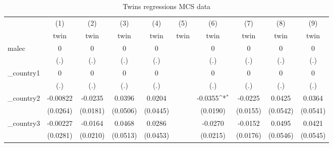 \begin{table}[htbp]\centering
\def\sym#1{\ifmmode^{#1}\else\(^{#1}\)\fi}
\caption{Twins regressions MCS data}
\begin{tabular}{l*{9}{c}}
\hline\hline
            &\multicolumn{1}{c}{(1)}&\multicolumn{1}{c}{(2)}&\multicolumn{1}{c}{(3)}&\multicolumn{1}{c}{(4)}&\multicolumn{1}{c}{(5)}&\multicolumn{1}{c}{(6)}&\multicolumn{1}{c}{(7)}&\multicolumn{1}{c}{(8)}&\multicolumn{1}{c}{(9)}\\
            &\multicolumn{1}{c}{twin}&\multicolumn{1}{c}{twin}&\multicolumn{1}{c}{twin}&\multicolumn{1}{c}{twin}&\multicolumn{1}{c}{twin}&\multicolumn{1}{c}{twin}&\multicolumn{1}{c}{twin}&\multicolumn{1}{c}{twin}&\multicolumn{1}{c}{twin}\\
\hline
malec       &           0         &           0         &           0         &           0         &                     &           0         &           0         &           0         &           0         \\
            &         (.)         &         (.)         &         (.)         &         (.)         &                     &         (.)         &         (.)         &         (.)         &         (.)         \\
[1em]
\_country1   &           0         &           0         &           0         &           0         &                     &           0         &           0         &           0         &           0         \\
            &         (.)         &         (.)         &         (.)         &         (.)         &                     &         (.)         &         (.)         &         (.)         &         (.)         \\
[1em]
\_country2   &    -0.00822         &     -0.0235         &      0.0396         &      0.0204         &                     &     -0.0355\sym{*}  &     -0.0225         &      0.0425         &      0.0364         \\
            &    (0.0264)         &    (0.0181)         &    (0.0506)         &    (0.0445)         &                     &    (0.0190)         &    (0.0155)         &    (0.0542)         &    (0.0541)         \\
[1em]
\_country3   &    -0.00227         &     -0.0164         &      0.0468         &      0.0286         &                     &     -0.0270         &     -0.0152         &      0.0495         &      0.0421         \\
            &    (0.0281)         &    (0.0210)         &    (0.0513)         &    (0.0453)         &                     &    (0.0215)         &    (0.0176)         &    (0.0546)         &    (0.0545)         \\

\end{tabular}
\end{table}
